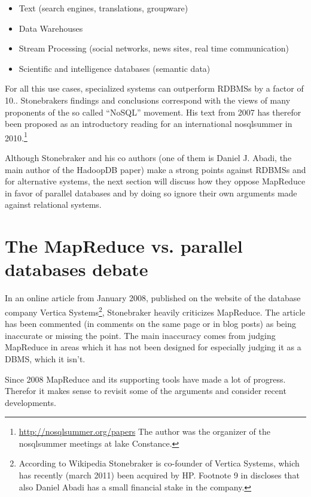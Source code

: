\documentclass[12pt,a4paper]{scrartcl}		%
\begin{document}
\begin{itemize}
\item Text (search engines, translations, groupware)
\item Data Warehouses
\item Stream Processing (social networks, news sites, real time communication)
\item Scientific and intelligence databases (semantic data)
\end{itemize}

For all this use cases, specialized systems can outperform RDBMSs by a factor of 10.\cite{conf/cidr/StonebrakerBCCGHHLRZ07}. Stonebrakers findings and conclusions correspond with the views of many proponents of the so called ``NoSQL'' movement. His text from 2007 has therefor been proposed as an introductory reading for an international nosqlsummer in 2010.\footnote{\url{http://nosqlsummer.org/papers} The author was the organizer of the nosqlsummer meetings at lake Constance.} 

Although Stonebraker and his co authors (one of them is Daniel J. Abadi, the main author of the HadoopDB paper) make a strong points against RDBMSs and for alternative systems, the next section will discuss how they oppose MapReduce in favor of parallel databases and by doing so ignore their own arguments made against relational systems.

\section{The MapReduce vs. parallel databases debate}
In an online article from January 2008, published on the website of the database company Vertica Systems\footnote
{According to Wikipedia Stonebraker is co-founder of Vertica Systems, which has recently (march 2011) been acquired by HP. Footnote 9 in \cite{journals/pvldb/AbouzeidBARS09} discloses that also Daniel Abadi has a small financial stake in the company.},
Stonebraker heavily criticizes MapReduce.\cite{sto08stepback} The article has been commented (in comments on the same page or in blog posts\cite{Chu-Carrol08hammers}) as being inaccurate or missing the point. The main inaccuracy comes from judging MapReduce in areas which it has not been designed for especially judging it as a DBMS, which it isn't.

Since 2008 MapReduce and its supporting tools have made a lot of progress. Therefor it makes sense to revisit some of the arguments and consider recent developments.
\end{document}
